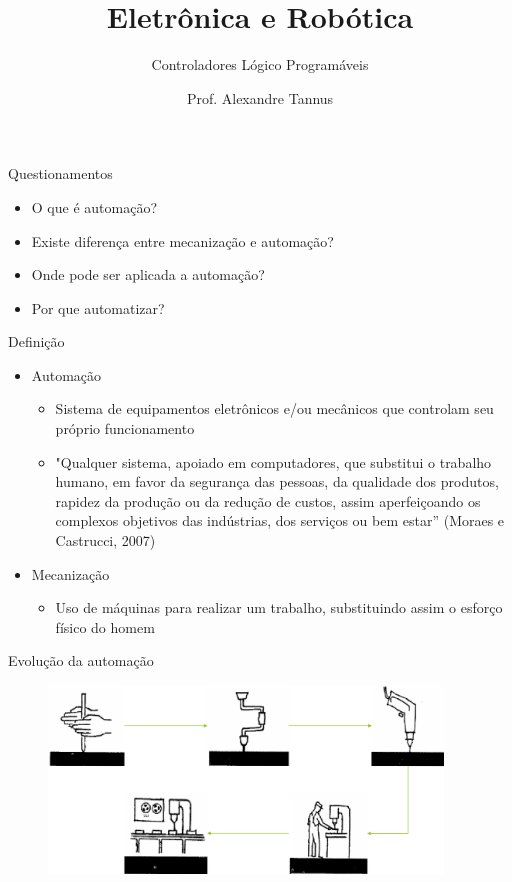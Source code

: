 \documentclass[aspectratio=169,
				xcolor=table]{beamer}
\title[]{Eletrônica e Robótica}
\subtitle[]{Controladores Lógico Programáveis}
\author[]{Prof. Alexandre Tannus}
\date{}
\begin{document}
	\begin{frame}
		\titlepage
	\end{frame}
	
	\begin{frame}{Questionamentos}
		\begin{itemize}
			\item O que é automação?
			\vspace{1em}
			\item Existe diferença entre mecanização e automação?
			\vspace{1em}
			\item Onde pode ser aplicada a automação?
			\vspace{1em}
			\item Por que automatizar?
		\end{itemize}		
	\end{frame}
	
	\begin{frame}{Definição}
		\begin{itemize}
			\item Automação
			\begin{itemize}
				\item Sistema de equipamentos eletrônicos e/ou mecânicos que controlam seu próprio funcionamento
				\item "Qualquer sistema, apoiado em computadores, que substitui o trabalho humano, em favor da segurança das pessoas, da qualidade dos produtos, rapidez da produção ou da redução de custos, assim aperfeiçoando os complexos objetivos das indústrias, dos serviços ou bem estar” (Moraes e Castrucci, 2007)
			\end{itemize}
			\vspace{0.7em}
			\item Mecanização
			\begin{itemize}
				\item Uso de máquinas para realizar um trabalho, substituindo assim o esforço físico do homem
			\end{itemize}
		\end{itemize}
	\end{frame}
	
	\begin{frame}{Evolução da automação}
		\begin{figure}[hbtp]
		\centering
		\includegraphics[height=5cm, keepaspectratio]{../figs/cap04/automacao.png}
		\end{figure}		
	\end{frame}
	
\end{document}
